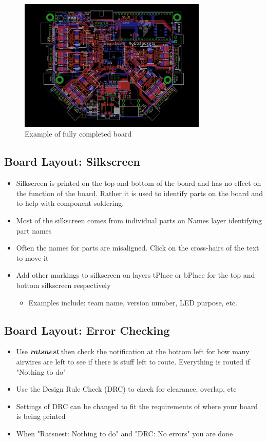 \documentclass{article}
\begin{document}
\begin{figure}[!h]
    \center
    \includegraphics[width=0.8\textwidth,height=0.6\textheight,keepaspectratio]{control}
    \caption {Example of fully completed board}
    \label{img:control}
\end{figure}

\subsection{Board Layout: Silkscreen}
\begin{itemize}
    \item Silkscreen is printed on the top and bottom of the board and has no effect on the function of the board. Rather it is used to identify parts on the board and to help with component soldering.
    \item Most of the silkscreen comes from individual parts on Names layer identifying part names
    \item Often the names for parts are misaligned. Click on the cross-hairs of the text to move it
    \item Add other markings to silkscreen on layers tPlace or bPlace for the top and bottom silkscreen
    respectively
        \begin{itemize}
        \item Examples include: team name, version number, LED purpose, etc.
        \end{itemize}
\end{itemize}

\subsection{Board Layout: Error Checking}
\begin{itemize}
    \item Use \textit{\textbf{ratsnest}} then check the notification at the bottom left for how many airwires are left to see if there is stuff left to route. Everything is routed if "Nothing to do"
    \item Use the Design Rule Check (DRC) to check for clearance, overlap, etc
    \item Settings of DRC can be changed to fit the requirements of where your board is being printed
    \item When "Ratsnest: Nothing to do" and "DRC: No errors" you are done
\end{itemize}
\end{document}
